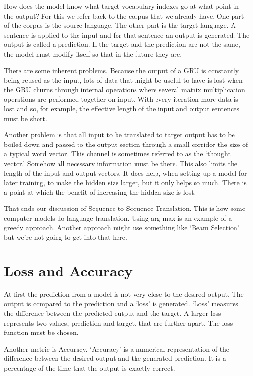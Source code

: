 How does the model know what target vocabulary indexes go at what point in the output? For this we refer back to the corpus that we already have. One part of the corpus is the source language. The other part is the target language. A sentence is applied to the input and for that sentence an output is generated. The output is called a prediction. If the target and the prediction are not the same, the model must modify itself so that in the future they are.

There are some inherent problems. Because the output of a GRU is constantly being reused as the input, lots of data that might be useful to have is lost when the GRU churns through internal operations where several matrix multiplication operations are performed together on input. With every iteration more data is lost and so, for example, the effective length of the input and output sentences must be short. 

Another problem is that all input to be translated to target output has to be boiled down and 
passed to the output section through a small corridor the size of a typical word vector. This channel is sometimes referred to as the `thought vector.' Somehow all necessary information must be there. This also limits the length of the input and output vectors. It does help, when setting
up a model for later training, to make the hidden size larger, but it only helps so much. There is a point at which the benefit of increasing the hidden size is lost.

That ends our discussion of Sequence to Sequence Translation. This is how some computer models do language translation. Using arg-max is an example of a greedy approach. Another approach might use something like `Beam Selection' but we're not going to get into that here.


\section{Loss and Accuracy}

At first the prediction from a model is not very close to the desired output. The output is compared to the prediction and a `loss' is generated. `Loss' measures the difference between the predicted output and the target. A larger loss represents two values, prediction and target, that are further apart. The loss function must be chosen. 


Another metric is Accuracy. `Accuracy' is a numerical representation of the difference between the desired output and the generated prediction. It is a percentage of the time that the output is exactly correct.

